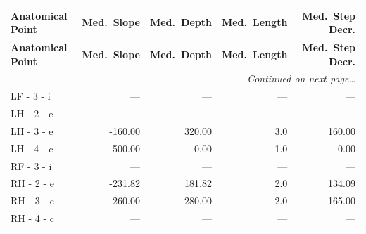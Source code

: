 \documentclass[a4paper,11pt]{article}
\begin{document}
\begin{small}
\begin{longtable}{p{4.5cm}rrrr}
\toprule
\textbf{Anatomical Point} &
\textbf{Med.\ Slope} &
\textbf{Med.\ Depth} &
\textbf{Med.\ Length} &
\textbf{Med.\ Step Decr.} \\
\midrule
\endfirsthead
\toprule
\textbf{Anatomical Point} &
\textbf{Med.\ Slope} &
\textbf{Med.\ Depth} &
\textbf{Med.\ Length} &
\textbf{Med.\ Step Decr.} \\
\midrule
\endhead
\midrule
\multicolumn{5}{r}{\small\emph{Continued on next page\ldots}} \\
\endfoot
\bottomrule
\endlastfoot
LF - 3 - i & --- & --- & --- & --- \\
LH - 2 - e & --- & --- & --- & --- \\
LH - 3 - e & -160.00 & 320.00 & 3.0 & 160.00 \\
LH - 4 - c & -500.00 & 0.00 & 1.0 & 0.00 \\
RF - 3 - i & --- & --- & --- & --- \\
RH - 2 - e & -231.82 & 181.82 & 2.0 & 134.09 \\
RH - 3 - e & -260.00 & 280.00 & 2.0 & 165.00 \\
RH - 4 - c & --- & --- & --- & --- \\
\end{longtable}
\end{small}
\end{document}
